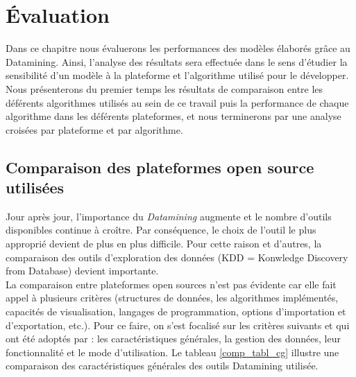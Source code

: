 \chapter[Évaluation de la performance du modèle développé]{Évaluation}
\label{evaluation}

\chapterabstract
{
Dans ce chapitre nous évaluerons les performances des modèles élaborés grâce au Datamining. Ainsi, l'analyse des résultats sera effectuée dans le sens d'étudier la sensibilité d'un modèle à la plateforme et l'algorithme utilisé pour le développer. Nous présenterons du premier temps les résultats de comparaison entre les déférents  algorithmes utilisés au sein de ce travail puis la performance de chaque algorithme dans les déférents plateformes, et nous terminerons par une analyse croisées par plateforme et par algorithme. 
}
\pagestyle{plain}

\section{Comparaison des plateformes open source utilisées}\label{comp_plat}
Jour après jour, l'importance du \textit{Datamining} augmente et le nombre d'outils disponibles continue à croître. Par conséquence, le choix de l'outil le plus approprié devient de plus en plus difficile. Pour cette raison et d'autres, la comparaison des outils d'exploration des données (KDD = Konwledge Discovery from Database) devient importante.\\

La comparaison entre plateformes open sources n’est pas évidente car elle
fait  appel  à  plusieurs  critères  (structures  de  données,  les  algorithmes
implémentés, capacités de visualisation, langages de programmation, options
d’importation et d’exportation, etc.). Pour ce faire, on s’est focalisé sur les
critères  suivants  et  qui  ont  été  adoptés  par  \cite{chen2007survey}  :  les
caractéristiques générales, la gestion des données, leur fonctionnalité et le mode
d’utilisation. Le tableau \ref{comp_tabl_cg} illustre une comparaison des caractéristiques générales des outils Datamining utilisée.\\

